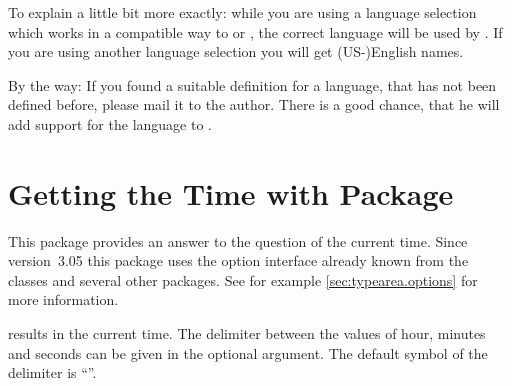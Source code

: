 \begin{Explain}
  To explain a little bit more exactly: while you are using a language
  selection which works in a compatible way to
   or
  , the correct language will be used
  by . If you are using another language selection you will
  get (US-)English names.
\end{Explain}

By the way: If you found a suitable definition for a language, that has not
been defined before, please mail it to the \KOMAScript{} author. There is a
good chance, that he will add support for the language to .%
\EndIndexGroup
%
\EndIndexGroup


\chapter{Getting the Time with Package }
\BeginIndexGroup
{}

This package provides an answer to the question of the current time. Since
version~3.05 this package uses the option interface already known from
the \KOMAScript{} classes and several other \KOMAScript{} packages. See for
example \autoref{sec:typearea.options} for more information.

\begin{Declaration}%
\end{Declaration}%
 results in the current time. The
delimiter between the values of hour, minutes and seconds can be given
in the optional argument. The default symbol of the delimiter is
``\PValue{:}''.

